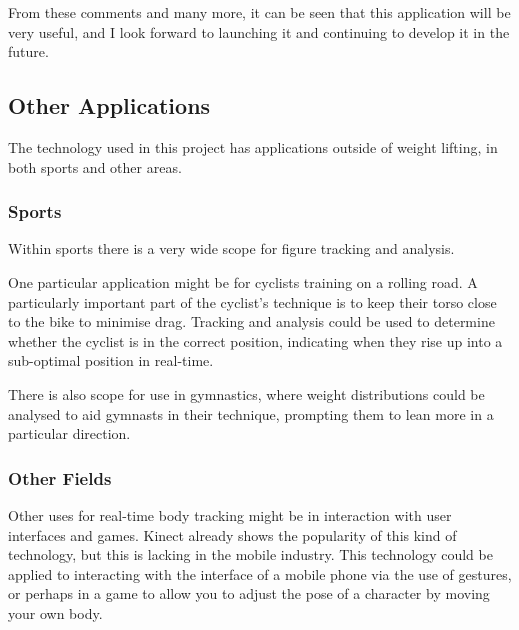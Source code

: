 From these comments and many more, it can be seen that this application will be very useful, and I look forward to launching it and continuing to develop it in the future.

\subsection{Other Applications}

The technology used in this project has applications outside of weight lifting, in both sports and other areas.

\subsubsection{Sports}

Within sports there is a very wide scope for figure tracking and analysis.

One particular application might be for cyclists training on a rolling road. A particularly important part of the cyclist's technique is to keep their torso close to the bike to minimise drag. Tracking and analysis could be used to determine whether the cyclist is in the correct position, indicating when they rise up into a sub-optimal position in real-time.

There is also scope for use in gymnastics, where weight distributions could be analysed to aid gymnasts in their technique, prompting them to lean more in a particular direction.

\subsubsection{Other Fields}

Other uses for real-time body tracking might be in interaction with user interfaces and games. Kinect already shows the popularity of this kind of technology, but this is lacking in the mobile industry. This technology could be applied to interacting with the interface of a mobile phone via the use of gestures, or perhaps in a game to allow you to adjust the pose of a character by moving your own body.

